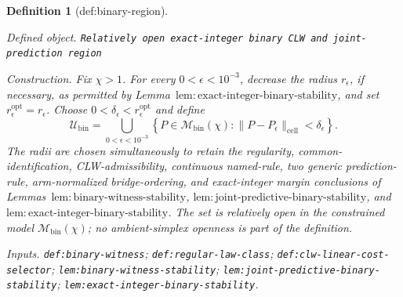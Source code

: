 \documentclass{article}
\newtheorem{definition}{Definition}
\begin{document}
\begin{definition}[def:binary-region]\label{def:binary-region}
\par\smallskip\noindent\emph{Defined object.} \texttt{Relatively open exact-\allowbreak{}integer binary CLW and joint-\allowbreak{}prediction region}
\par\smallskip\noindent\emph{Construction.} Fix \(\chi>1\).  For every \(0<\epsilon<10^{-3}\), decrease the radius \(r_\epsilon\), if necessary, as permitted by Lemma~\(\mathrm{lem{:}exact\text{-}integer\text{-}binary\text{-}stability}\), and set \(r_\epsilon^{\mathrm{opt}}=r_\epsilon\).  Choose \(0<\delta_\epsilon<r_\epsilon^{\mathrm{opt}}\) and define
\[
 \mathcal U_{\mathrm{bin}}
 =\bigcup_{0<\epsilon<10^{-3}}
 \left\{P\in\mathcal M_{\mathrm{bin}}(\chi):
 \|P-P_\epsilon\|_{\mathrm{cell}}<\delta_\epsilon\right\}. \tag{1}
\]
The radii are chosen simultaneously to retain the regularity, common-identification, CLW-admissibility, continuous named-rule, two generic prediction-rule, arm-normalized bridge-ordering, and exact-integer margin conclusions of Lemmas~\(\mathrm{lem{:}binary\text{-}witness\text{-}stability}\), \(\mathrm{lem{:}joint\text{-}predictive\text{-}binary\text{-}stability}\), and \(\mathrm{lem{:}exact\text{-}integer\text{-}binary\text{-}stability}\).  The set is relatively open in the constrained model \(\mathcal M_{\mathrm{bin}}(\chi)\); no ambient-simplex openness is part of the definition.
\par\smallskip\noindent\emph{Inputs.} \texttt{def:\allowbreak{}binary-\allowbreak{}witness}; \texttt{def:\allowbreak{}regular-\allowbreak{}law-\allowbreak{}class}; \texttt{def:\allowbreak{}clw-\allowbreak{}linear-\allowbreak{}cost-\allowbreak{}selector}; \texttt{lem:\allowbreak{}binary-\allowbreak{}witness-\allowbreak{}stability}; \texttt{lem:\allowbreak{}joint-\allowbreak{}predictive-\allowbreak{}binary-\allowbreak{}stability}; \texttt{lem:\allowbreak{}exact-\allowbreak{}integer-\allowbreak{}binary-\allowbreak{}stability}.
\end{definition}
\end{document}
